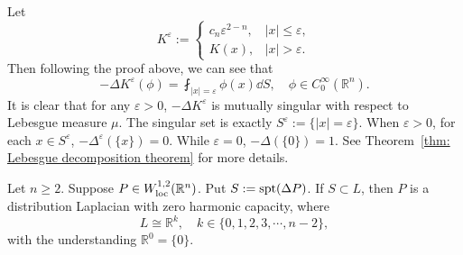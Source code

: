 \begin{remark}
  Let 
  \[
  K^\varepsilon := 
  \begin{cases}
    c_n\varepsilon^{2-n}, & |x|\leq\varepsilon,\\
    K(x), & |x|>\varepsilon.
  \end{cases}
  \]
  Then following the proof above, we can see that 
  \[
  -\Delta K^\varepsilon(\phi) = \fint_{|x|=\varepsilon}\phi(x)\dd S,\quad \phi\in C_0^\infty(\mathbb R^n).
  \] 
  It is clear that for any $\varepsilon>0$,
  $-\Delta K^\varepsilon$ is mutually singular with respect to Lebesgue measure $\mu$.
  The singular set is exactly $S^\varepsilon := \{|x|=\varepsilon\}$.
  When $\varepsilon>0$, for each $x\in S^\varepsilon$, $-\Delta^\varepsilon(\{x\}) = 0$.
  While $\varepsilon = 0$, $-\Delta(\{0\}) = 1$. 
  See Theorem~\ref{thm: Lebesgue decomposition theorem} for more details.
\end{remark}

\begin{proposition}
  Let $n\geq2$. 
  Suppose $P\in W_{\operatorname*{loc}}^{1,2}(\mathbb R^n)$.
  Put $S:= \operatorname*{spt}(\Delta P)$.
  If $S\subset L$, 
  then $P$ is a distribution Laplacian with zero harmonic capacity,
  where
  \[
  L\cong \mathbb{R}^k,\quad k\in\{0,1,2,3,\cdots, n-2\},
  \]
  with the understanding $\mathbb R^0=\{0\}$.
\end{proposition}

